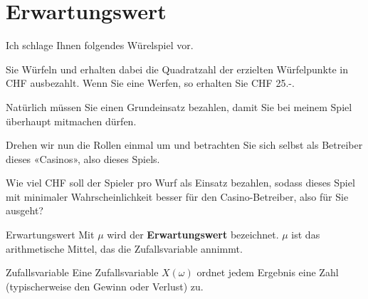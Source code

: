 \section{Erwartungswert}

Ich schlage Ihnen folgendes Würelspiel vor.

Sie Würfeln und erhalten dabei die Quadratzahl der erzielten
Würfelpunkte in CHF ausbezahlt. Wenn Sie \zB eine  Werfen,
so erhalten Sie CHF 25.-.

Natürlich müssen Sie einen Grundeinsatz bezahlen, damit Sie bei meinem
Spiel überhaupt mitmachen dürfen.

Drehen wir nun die Rollen einmal um und betrachten Sie sich selbst als
Betreiber dieses «Casinos», also dieses Spiels.

Wie viel CHF soll der Spieler pro Wurf als Einsatz bezahlen, sodass
dieses Spiel mit minimaler Wahrscheinlichkeit besser für den
Casino-Betreiber, also für Sie ausgeht?




  \begin{definition}{Erwartungswert}{}
    Mit $\mu$ wird der \textbf{Erwartungswert} bezeichnet.
    $\mu$ ist das arithmetische Mittel, das die Zufallsvariable
    annimmt.
  \end{definition}

  \begin{definition}{Zufallsvariable}{}
    Eine Zufallsvariable $X(\omega)$ ordnet jedem Ergebnis eine Zahl
    (typischerweise den Gewinn oder Verlust) zu.
    \end{definition}
\newpage
